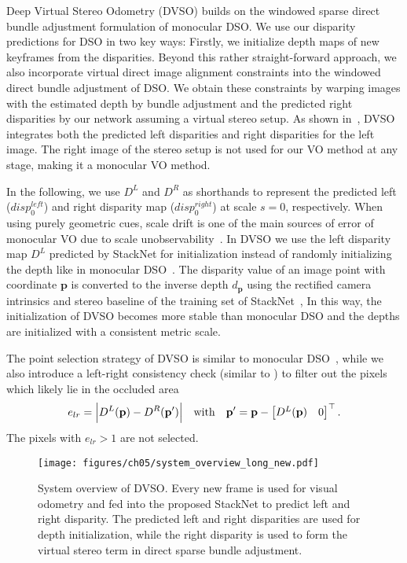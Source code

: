 \documentclass[runningheads]{llncs}
\begin{document}
Deep Virtual Stereo Odometry (DVSO) builds on the windowed sparse direct bundle adjustment formulation of monocular DSO.
We use our disparity predictions for DSO in two key ways:
Firstly, we initialize depth maps of new keyframes from the disparities.
Beyond this rather straight-forward approach, we also incorporate virtual direct image alignment constraints into the windowed direct bundle adjustment of DSO.
We obtain these constraints by warping images with the estimated depth by bundle adjustment and the predicted right disparities by our network assuming a virtual stereo setup. 
As shown in~, DVSO integrates both the predicted left disparities and right disparities for the left image. 
The right image of the stereo setup is not used for our VO method at any stage, making it a monocular VO method.

In the following, we use 
$D^{L}$ and $D^{R}$ 
as shorthands to represent the predicted left 
($disp_0^{left}$) and right disparity map 
($disp_0^{right}$) at 
scale $s = 0$, respectively.
When using purely geometric cues, scale drift is one of the main sources of 
error of monocular VO due to scale unobservability~\cite{strasdat2010scale}. 
In DVSO we use the left disparity map 
$D^{L}$ predicted by StackNet for initialization instead of randomly initializing the depth like in monocular 
DSO~\cite{engel2017direct}. 
The disparity value of an image point with coordinate $\mathbf{p}$ is converted to the inverse 
depth $d_\mathbf{p}$ using the rectified camera 
intrinsics and stereo baseline of the training set of 
StackNet~\cite{hartley2003multiple},
In this way, the initialization of DVSO becomes more stable than monocular 
DSO and the depths are initialized with a consistent metric scale. 

The point selection strategy of DVSO is similar to 
monocular DSO~\cite{engel2017direct}, while we also introduce a left-right 
consistency check (similar to ) to filter out the 
pixels which likely lie in the occluded area
\begin{equation}
	e_{lr} = \Bigl | D^{L}(\mathbf{p}) - 
	D^{R}(\mathbf{p'}) \Bigr | \quad \text{with} \quad \mathbf{p'} = \mathbf{p} 
	- 
	\begin{bmatrix}
	D^L(\mathbf{p}) & 0\\
	\end{bmatrix}^\top.
\end{equation}
The pixels with $e_{lr} > 1$ are not selected. 

\begin{figure}[tb]
	\centering
	\texttt{[image: figures/ch05/system\_overview\_long\_new.pdf]}
	\caption{System overview of 
	DVSO. Every new frame is used for visual odometry and fed into 
		the proposed StackNet to predict left and right disparity. The predicted left and right disparities are used for 
		depth initialization, while the right disparity is used to form the virtual stereo term in direct sparse bundle adjustment.}
	\label{fig:sys_overview}
\end{figure}
\end{document}
